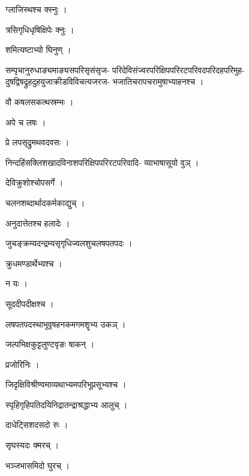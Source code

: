 \documentclass[10pt, openany]{book}
\begin{document}
\noindent ग्लाजिस्थश्च क्स्नुः ।

\noindent त्रसिगृधिधृषिक्षिपेः क्नुः ।

\noindent शमित्यष्टाभ्यो घिनुण् ।

\noindent सम्पृचानुरुधाङ्यमाङ्यसपरिसृसंसृज- परिदेविसंज्वरपरिक्षिपपरिरटपरिवदपरिदहपरिमुह- दुषद्विषद्रुहदुहयुजाक्रीडविविचत्यजरज- भजातिचरापचरामुषाभ्याहनश्च ।

\noindent वौ कषलसकत्थस्रम्भः ।

\noindent अपे च लषः ।

\noindent प्रे लपसृद्रुमथवदवसः ।

\noindent निन्दहिंसक्लिशखादविनाशपरिक्षिपपरिरटपरिवादि- व्याभाषासूयो वुञ् ।

\noindent देविक्रुशोश्चोपसर्गे ।

\noindent चलनशब्दार्थादकर्मकाद्युच् ।

\noindent अनुदात्तेतश्च हलादेः ।

\noindent जुचङ्क्रम्यदन्द्रम्यसृगृधिज्वलशुचलषपतपदः ।

\noindent क्रुधमण्डार्थेभ्यश्च ।

\noindent न यः ।

\noindent सूददीपदीक्षश्च ।

\noindent लषपतपदस्थाभूवृषहनकमगमशॄभ्य उकञ् ।

\noindent जल्पभिक्षकुट्टलुण्टवृङः षाकन् ।

\noindent प्रजोरिनिः ।

\noindent जिदृक्षिविश्रीण्वमाव्यथाभ्यमपरिभूप्रसूभ्यश्च ।

\noindent स्पृहिगृहिपतिदयिनिद्रातन्द्राश्रद्धाभ्य आलुच् ।

\noindent दाधेट्सिशदसदो रुः ।

\noindent सृघस्यदः क्मरच् ।

\noindent भञ्जभासमिदो घुरच् ।
\end{document}
